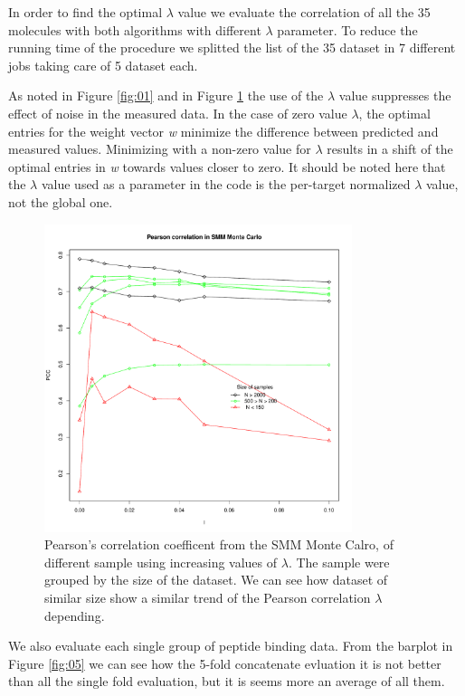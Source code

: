 \documentclass{bioinfo}
\begin{document}
\begin{application}
\par In order to find the optimal $\lambda$ value we evaluate the correlation of all the 35 molecules with both algorithms with different $\lambda$ parameter. To reduce the running time of the procedure we splitted the list of the 35 dataset in 7 different jobs taking care of 5 dataset each. 
\par As noted in Figure \ref{fig:01} and in Figure \ref{fig:02} the use of the $\lambda$ value suppresses the effect of noise in the measured data. In the case of zero value $\lambda$, the optimal entries for the weight vector \textit{w} minimize the difference between predicted and measured values.  Minimizing with a non-zero value for $\lambda$ results in a shift of the optimal entries in \textit{w} towards values closer to zero. It should be noted here that the $\lambda$ value used as a parameter in the code is the per-target normalized $\lambda$ value, not the global one.

\begin{figure}[!tpb]
\centerline{\includegraphics[width=9cm]{fig/smm_mc_l005_ppc_size.pdf}}
\caption{Pearson's correlation coefficent from the SMM Monte Calro, of different sample using increasing values of $\lambda$. The sample were grouped by the size of the dataset. We can see how dataset of similar size show a similar trend of the Pearson correlation $\lambda$ depending.}
\label{fig:02}
\end{figure}
\par We also evaluate each single group of peptide binding data. From the barplot in Figure \ref{fig:05} we can see how the 5-fold concatenate evluation it is not better than all the single fold evaluation, but it is seems more an average of all them.


\end{application}
\end{document}
